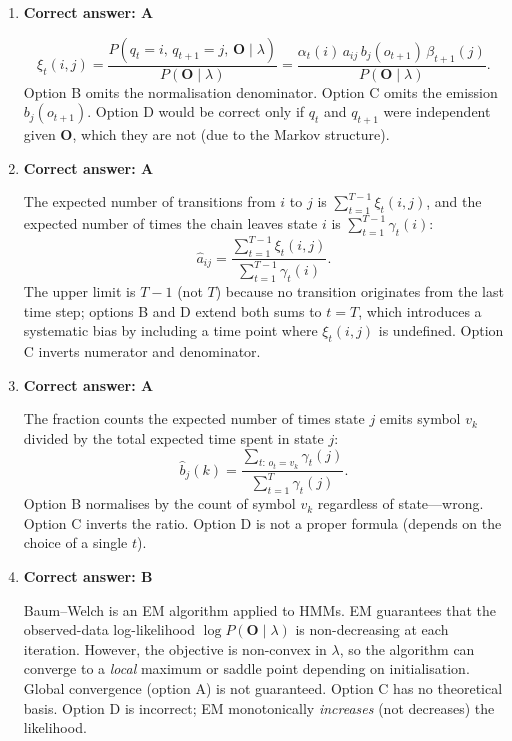 \documentclass[12pt]{article}
\begin{document}
\begin{enumerate}[label=\textbf{Q\arabic*.}, leftmargin=*, itemsep=1.5em]
\item \textbf{Correct answer: A}

\[
    \xi_t(i,j)
    = \frac{P(q_t=i,\,q_{t+1}=j,\,\mathbf{O}\mid\lambda)}{P(\mathbf{O}\mid\lambda)}
    = \frac{\alpha_t(i)\,a_{ij}\,b_j(o_{t+1})\,\beta_{t+1}(j)}
           {P(\mathbf{O}\mid\lambda)}.
\]
Option B omits the normalisation denominator.
Option C omits the emission $b_j(o_{t+1})$.
Option D would be correct only if $q_t$ and $q_{t+1}$ were independent given $\mathbf{O}$,
which they are not (due to the Markov structure).

\item \textbf{Correct answer: A}

The expected number of transitions from $i$ to $j$ is
$\sum_{t=1}^{T-1}\xi_t(i,j)$, and the expected number of times the chain leaves
state $i$ is $\sum_{t=1}^{T-1}\gamma_t(i)$:
\[
    \hat{a}_{ij}
    = \frac{\displaystyle\sum_{t=1}^{T-1}\xi_t(i,j)}
           {\displaystyle\sum_{t=1}^{T-1}\gamma_t(i)}.
\]
The upper limit is $T-1$ (not $T$) because no transition originates from the
last time step; options B and D extend both sums to $t=T$, which introduces a
systematic bias by including a time point where $\xi_t(i,j)$ is undefined.
Option C inverts numerator and denominator.

\item \textbf{Correct answer: A}

The fraction counts the expected number of times state $j$ emits symbol $v_k$
divided by the total expected time spent in state $j$:
\[
    \hat{b}_j(k)
    = \frac{\displaystyle\sum_{t:\,o_t=v_k}\gamma_t(j)}
           {\displaystyle\sum_{t=1}^{T}\gamma_t(j)}.
\]
Option B normalises by the count of symbol $v_k$ regardless of state---wrong.
Option C inverts the ratio.
Option D is not a proper formula (depends on the choice of a single $t$).

\item \textbf{Correct answer: B}

Baum--Welch is an EM algorithm applied to HMMs.  EM guarantees that the
observed-data log-likelihood $\log P(\mathbf{O}\mid\lambda)$ is non-decreasing
at each iteration.  However, the objective is non-convex in $\lambda$, so the
algorithm can converge to a \emph{local} maximum or saddle point depending on
initialisation.  Global convergence (option A) is not guaranteed.
Option C has no theoretical basis.
Option D is incorrect; EM monotonically \emph{increases} (not decreases) the likelihood.


\end{enumerate}
\end{document}

